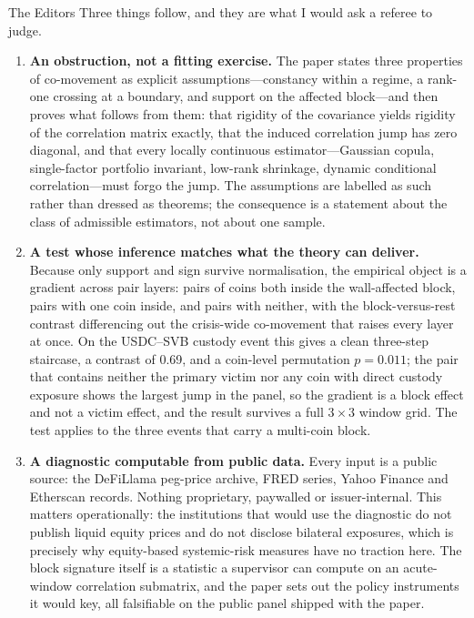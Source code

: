\documentclass[11pt]{letter}
\begin{document}
\begin{letter}{The Editors}
Three things follow, and they are what I would ask a referee to judge.

\begin{enumerate}
\item \textbf{An obstruction, not a fitting exercise.} The paper states three properties of co-movement as explicit assumptions---constancy within a regime, a rank-one crossing at a boundary, and support on the affected block---and then proves what follows from them: that rigidity of the covariance yields rigidity of the correlation matrix exactly, that the induced correlation jump has zero diagonal, and that every locally continuous estimator---Gaussian copula, single-factor portfolio invariant, low-rank shrinkage, dynamic conditional correlation---must forgo the jump. The assumptions are labelled as such rather than dressed as theorems; the consequence is a statement about the class of admissible estimators, not about one sample.

\item \textbf{A test whose inference matches what the theory can deliver.} Because only support and sign survive normalisation, the empirical object is a gradient across pair layers: pairs of coins both inside the wall-affected block, pairs with one coin inside, and pairs with neither, with the block-versus-rest contrast differencing out the crisis-wide co-movement that raises every layer at once. On the USDC--SVB custody event this gives a clean three-step staircase, a contrast of 0.69, and a coin-level permutation $p = 0.011$; the pair that contains neither the primary victim nor any coin with direct custody exposure shows the largest jump in the panel, so the gradient is a block effect and not a victim effect, and the result survives a full $3\times3$ window grid. The test applies to the three events that carry a multi-coin block.

\item \textbf{A diagnostic computable from public data.} Every input is a public source: the DeFiLlama peg-price archive, FRED series, Yahoo Finance and Etherscan records. Nothing proprietary, paywalled or issuer-internal. This matters operationally: the institutions that would use the diagnostic do not publish liquid equity prices and do not disclose bilateral exposures, which is precisely why equity-based systemic-risk measures have no traction here. The block signature itself is a statistic a supervisor can compute on an acute-window correlation submatrix, and the paper sets out the policy instruments it would key, all falsifiable on the public panel shipped with the paper.


\end{enumerate}
\end{letter}
\end{document}

